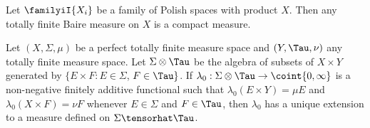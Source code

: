  Let $\familyiI{X_i}$ be a family of Polish
spaces with product $X$.   Then any totally finite Baire measure on $X$
is a compact measure.


Let $(X,\Sigma,\mu)$ be a perfect totally finite measure
space and $(Y,\Tau,\nu)$ any totally finite measure space.   Let
$\Sigma\otimes\Tau$ be the algebra of subsets of $X\times Y$ generated
by $\{E\times F:E\in\Sigma$, $F\in\Tau\}$.   If
$\lambda_0:\Sigma\otimes\Tau\to\coint{0,\infty}$ is a non-negative
finitely additive functional such that $\lambda_0(E\times Y)=\mu E$ and
$\lambda_0(X\times F)=\nu F$ whenever $E\in\Sigma$ and $F\in\Tau$, then
$\lambda_0$ has a unique extension to a measure defined on $\Sigma\tensorhat\Tau$.

